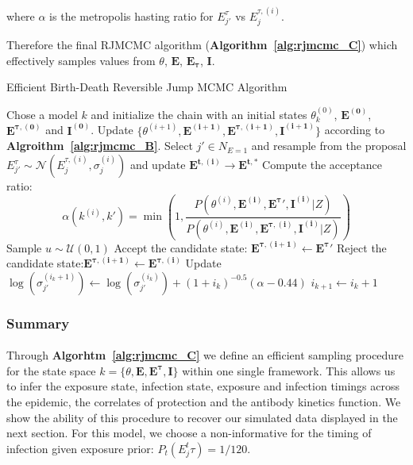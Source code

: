\documentclass{article}
\begin{document}
where $\alpha$ is the metropolis hasting ratio for $E_{j'}^{\tau}$ vs $E_j^{\tau, (i)}$.

Therefore the final RJMCMC algorithm (\textbf{Algorithm~\ref{alg:rjmcmc_C}}) which effectively samples values from $\theta$, $\mathbf{E}$, $\mathbf{E_\tau}$, $\mathbf{I}$. 

\begin{algorithm}[H]
\caption{Efficient Birth-Death Reversible Jump MCMC Algorithm}
\label{alg:rjmcmc_C}
\begin{algorithmic}[1]
 \State Chose a model $k$ and initialize the chain with an initial states $\theta^{(0)}_{k}$, $\mathbf{E^{(0)}}$, $\mathbf{E^{\tau, (0)}}$ and $\mathbf{I^{(0)}}$.
    	\State Update $\{\theta^{(i + 1)}, \mathbf{E^{(i + 1)}}, \mathbf{E^{\tau, (i + 1)}}, \mathbf{I^{(i + 1)}}\}$ according to \textbf{Algroithm~\ref{alg:rjmcmc_B}}.
        \State Select $j' \in N_{E = 1}$ and resample from the proposal $E_{j'}^{\tau} \sim \mathcal{N}\left(E_{j}^{\tau, (i)}, \sigma^{(i)}_{j}\right)$ and update $\mathbf{E^{t, (i)}} \rightarrow \mathbf{E^{t, *}}$
            \State Compute the acceptance ratio:
        		\[
        		\alpha(k^{(i)}, k') = \min\left(1, \frac{P(\theta^{(i)}, \mathbf{E^{(i)}}, \mathbf{E^{\tau}'}, \mathbf{I^{(i)}}|Z)}{P(\theta^{(i)}, \mathbf{E^{(i)}}, \mathbf{E^{\tau, (i)}}, \mathbf{I^{(i)}}|Z)} \right)
        			\]
  \State Sample $u \sim \mathcal{U}(0, 1)$
            	\State Accept the candidate state: $\mathbf{E^{\tau, (i + 1)}}  \leftarrow \mathbf{E^{\tau}'} $
        \Else
            \State Reject the candidate state:$\mathbf{E^{\tau, (i + 1)}}  \leftarrow \mathbf{E^{\tau, (i)}} $
        \EndIf 
        \State Update $\log\left(\sigma_{j'}^{(i_k + 1)}\right) \leftarrow \log\left(\sigma_{j'}^{(i_k)}\right) + (1 +  i_k)^{-0.5}(\alpha - 0.44)$
        \State $i_{k + 1} \leftarrow i_k + 1$
            \EndFor
    \EndFor
\end{algorithmic}
\end{algorithm}


\subsubsection{Summary}
\paragraph{}Through \textbf{Algorhtm~\ref{alg:rjmcmc_C}} we define an efficient sampling procedure for the state space $k = \{\theta, \mathbf{E}, \mathbf{E^\tau}, \mathbf{I}\}$ within one single framework. This allows us to infer the exposure state, infection state, exposure and infection timings across the epidemic, the correlates of protection and the antibody kinetics function. We show the ability of this procedure to recover our simulated data displayed in the next section.
 For this model, we choose a non-informative for the timing of infection given exposure prior: $P_t(E_j^t\tau) = 1 / 120$.
\end{document}
